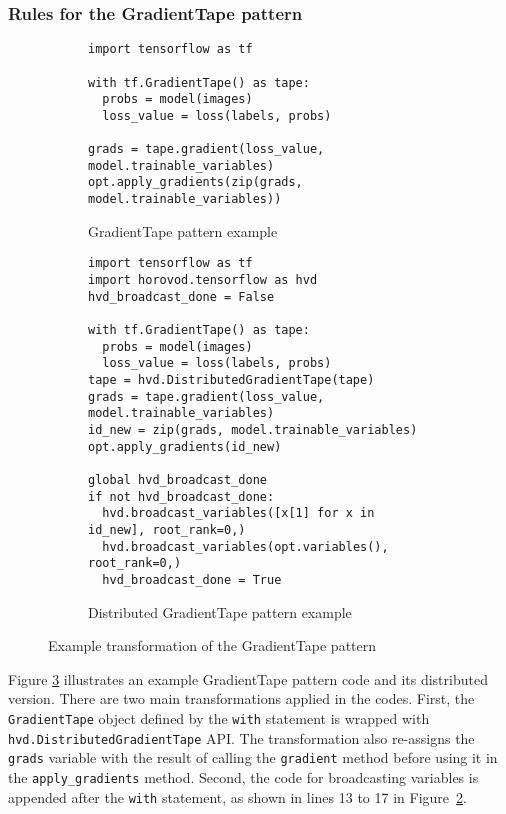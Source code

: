 \subsubsection{Rules for the GradientTape pattern}\label{sec:grad}

\begin{figure}[ht!]
  \centering
  \begin{subfigure}[t]{\textwidth}
    \begin{lstlisting}[style=mpython]
import tensorflow as tf

with tf.GradientTape() as tape:
  probs = model(images)
  loss_value = loss(labels, probs)

grads = tape.gradient(loss_value, model.trainable_variables)
opt.apply_gradients(zip(grads, model.trainable_variables))\end{lstlisting}
    \caption{GradientTape pattern example}
    \label{fig:trans:gtapetrans:a}
  \end{subfigure}
  \hspace{5mm}
  \begin{subfigure}[t]{1\textwidth}
    \begin{lstlisting}[style=mpython]
import tensorflow as tf
import horovod.tensorflow as hvd
hvd_broadcast_done = False

with tf.GradientTape() as tape:
  probs = model(images)
  loss_value = loss(labels, probs)
tape = hvd.DistributedGradientTape(tape)
grads = tape.gradient(loss_value, model.trainable_variables)
id_new = zip(grads, model.trainable_variables)
opt.apply_gradients(id_new)

global hvd_broadcast_done
if not hvd_broadcast_done:
  hvd.broadcast_variables([x[1] for x in id_new], root_rank=0,)
  hvd.broadcast_variables(opt.variables(), root_rank=0,)
  hvd_broadcast_done = True\end{lstlisting}
    \caption{Distributed GradientTape pattern example}
    \label{fig:trans:gtapetrans:b}
  \end{subfigure}
  \caption{Example transformation of the GradientTape pattern}
  \label{fig:trans:gtapetrans}
\end{figure}

\noindent
Figure \ref{fig:trans:gtapetrans} illustrates an example GradientTape pattern
code and its distributed version.  
There are two main transformations applied in the codes.
First, the {\tt GradientTape} object defined by the {\tt with} statement is
wrapped with {\tt hvd.DistributedGradientTape} API.
The transformation also re-assigns the {\tt grads} variable with the result of
calling the {\tt gradient} method before using it in the {\tt apply\_gradients}
method.
Second, the code for broadcasting variables is appended after the {\tt with}
statement, as shown in lines 13 to 17 in Figure~\ref{fig:trans:gtapetrans:b}.

